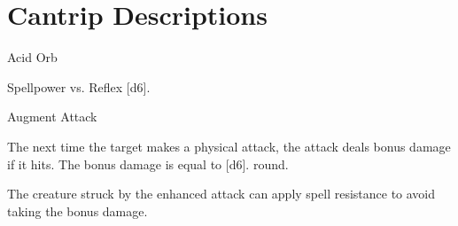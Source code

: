 \section{Cantrip Descriptions}

\begin{spellsection}{Acid Orb}
    \begin{spellheader}
    \end{spellheader}
    \begin{spellcontent}
        \begin{spelltargetinginfo}
        \end{spelltargetinginfo}
        \begin{spelleffects}
            \begin{spellattack}{Spellpower vs. Reflex}
                \spellsuccess {}[d6].
            \end{spellattack}
        \end{spelleffects}
    \end{spellcontent}
    \begin{spellfooter}
        \physicalspellnotes
    \end{spellfooter}
\end{spellsection}

\begin{spellsection}{Augment Attack}
    \begin{spellheader}
    \end{spellheader}
    \begin{spellcontent}
        \begin{spelltargetinginfo}
        \end{spelltargetinginfo}
        \begin{spelleffects}
            \spelleffect The next time the target makes a physical attack, the attack deals bonus damage if it hits.
            The bonus damage is equal to \spelldamage{}[d6].
             round.
        \end{spelleffects}
    \end{spellcontent}
    \begin{spellfooter}
        \spellnotes The creature struck by the enhanced attack can apply spell resistance to avoid taking the bonus damage.
    \end{spellfooter}
\end{spellsection}


